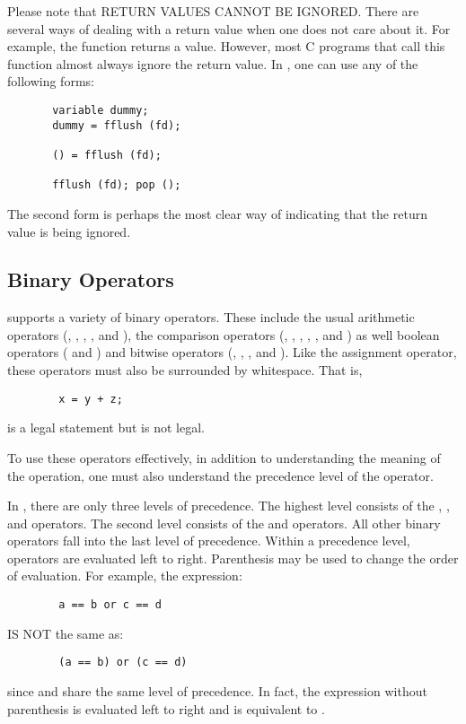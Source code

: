    Please note that RETURN VALUES CANNOT BE IGNORED.  There are several ways
   of dealing with a return value when one does not care about it.  For
   example, the function  returns a value.  However, most C
   programs that call this function almost always ignore the return value.
   In \slang{}, one can use any of the following forms:
\begin{verbatim}
       variable dummy;   
       dummy = fflush (fd);
     
       () = fflush (fd);
     
       fflush (fd); pop ();
\end{verbatim}
  The second form is perhaps the most clear way of indicating that the return
  value is being ignored.

\subsection{Binary Operators}

   \slang{} supports a variety of binary operators.  These include the usual
   arithmetic operators (\var{+}, \var{-}, \var{*}, \var{/}, and ), the comparison
   operators (\var{>}, \var{>=}, \var{<}, \var{<=}, \var{!=}, and \var{==}) as well boolean
   operators ( and ) and bitwise operators (\var{|}, \var{\&}, , 
   and ).  Like the assignment operator, these operators must also be
   surrounded by whitespace.  That is, 
   
\begin{verbatim}
        x = y + z;
\end{verbatim}
   is a legal statement but  is not legal.

   To use these operators effectively, in addition to understanding the
   meaning of the operation, one must also understand the precedence level
   of the operator.

   In \slang{}, there are only three levels of precedence.  The highest level
   consists of the \var{*}, \var{/}, and  operators.  The second level consists
   of the \var{+} and \var{-} operators.  All other binary operators fall into the
   last level of precedence.  Within a precedence level, operators are
   evaluated left to right.  Parenthesis may be used to change the order of
   evaluation.  For example, the expression:   
\begin{verbatim}
        a == b or c == d
\end{verbatim}
   IS NOT the same as:
\begin{verbatim}
        (a == b) or (c == d)
\end{verbatim}
   since \var{==} and  share the same level of precedence.  In fact, the
   expression without parenthesis is evaluated left to right and is
   equivalent to .


